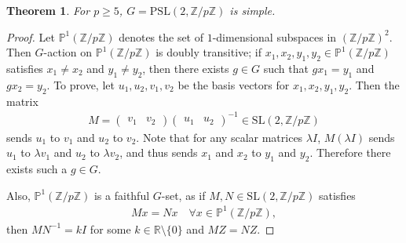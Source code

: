 \documentclass[12pt]{report}
\theoremstyle{plain}
\newtheorem{theorem}{Theorem}[section]
\theoremstyle{remark}
\theoremstyle{definition}
\newcommand{\Z}{\mathbb{Z}}
\newcommand{\R}{\mathbb{R}}
\begin{document}
\begin{theorem}
    For $p\ge 5$, $G=\mathrm{PSL}(2,\Z/p\Z)$ is simple.
\end{theorem}
\begin{proof}
    Let $\mathbb{P}^1(\Z/p\Z)$ denotes the set of $1$-dimensional subspaces in $(\Z/p\Z)^2$. Then $G$-action on $\mathbb{P}^1(\Z/p\Z)$ is doubly transitive; if $x_1,x_2,y_1,y_2\in \mathbb{P}^1(\Z/p\Z)$ satisfies $x_1\neq x_2$ and $y_1\neq y_2$, then there exists $g\in G$ such that $gx_1=y_1$ and $gx_2=y_2$. To prove, let $u_1, u_2,v_1,v_2$ be the basis vectors for $x_1,x_2,y_1,y_2$. Then the matrix
    \begin{align*}
        M = 
        \begin{pmatrix}
            v_1 & v_2
        \end{pmatrix}
        \begin{pmatrix}
            u_1 & u_2
        \end{pmatrix}^{-1} \in \mathrm{SL}(2,\Z/p\Z)
    \end{align*}
    sends $u_1$ to $v_1$ and $u_2$ to $v_2$. Note that for any scalar matrices $\lambda I$, $M(\lambda I)$ sends $u_1$ to $\lambda v_1$ and $u_2$ to $\lambda v_2$, and thus sends $x_1$ and $x_2$ to $y_1$ and $y_2$. Therefore there exists such a $g\in G$.

    Also, $\mathbb{P}^1(\Z/p\Z)$ is a faithful $G$-set, as if $M,N\in \mathrm{SL}(2,\Z/p\Z)$ satisfies
    \begin{align*}
        Mx=Nx\quad \forall x\in \mathbb{P}^1(\Z/p\Z),
    \end{align*}
    then $MN^{-1}=kI$ for some $k\in\R\setminus\{0\}$ and $MZ=NZ$.


\end{proof}
\end{document}
